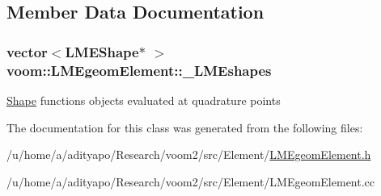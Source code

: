 \subsection{Member Data Documentation}
\hypertarget{classvoom_1_1_l_m_egeom_element_a76909b4c2030b797f17106f5bc5e3b11}{
\subsubsection[{\_\-LMEshapes}]{\setlength{\rightskip}{0pt plus 5cm}vector$<${\bf LMEShape}$\ast$ $>$ {\bf voom::LMEgeomElement::\_\-LMEshapes}}}
\label{classvoom_1_1_l_m_egeom_element_a76909b4c2030b797f17106f5bc5e3b11}
\hyperlink{classvoom_1_1_shape}{Shape} functions objects evaluated at quadrature points 

The documentation for this class was generated from the following files:\begin{DoxyCompactItemize}
\item 
/u/home/a/adityapo/Research/voom2/src/Element/\hyperlink{_l_m_egeom_element_8h}{LMEgeomElement.h}\item 
/u/home/a/adityapo/Research/voom2/src/Element/LMEgeomElement.cc\end{DoxyCompactItemize}
